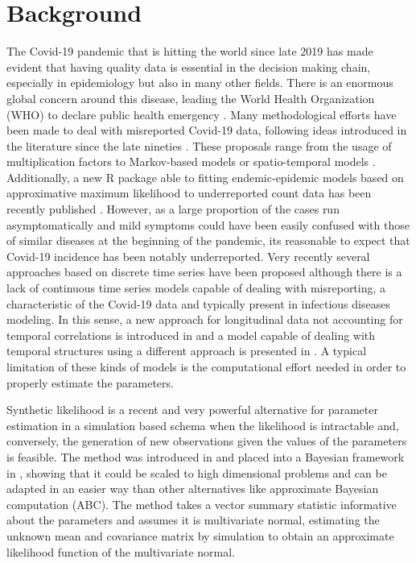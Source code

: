 \documentclass{bmcart}
\begin{document}
\section*{Background}\label{intro}
The Covid-19 pandemic that is hitting the world since late 2019 has made evident that having quality data is essential in the decision making chain, especially in epidemiology but also in many other fields. There is an enormous global concern around this disease, leading the World Health Organization (WHO) to declare public health emergency \cite{Sohrabi2020}. Many methodological efforts have been made to deal with misreported Covid-19 data, following ideas introduced in the literature since the late nineties \cite{Bernard2014,Arendt2013,Rosenman2006,Alfonso2015,Winkelmann1996,Gibbons2014}. These proposals range from the usage of multiplication factors \cite{Stocks2018} to Markov-based models \cite{Azmon2014,Magal2018} or spatio-temporal models \cite{Stoner2019}. Additionally, a new R \cite{RCoreTeam2019} package able to fitting endemic-epidemic models based on approximative maximum likelihood to underreported count data has been recently published \cite{JohannesBracher2019}. However, as a large proportion of the cases run asymptomatically \cite{Oran2020} and mild symptoms could have been easily confused with those of similar diseases at the beginning of the pandemic, its reasonable to expect that Covid-19 incidence has been notably underreported. Very recently several approaches based on discrete time series have been proposed \cite{Fernandez-Fontelo2016,FernandezFontelo2019,Fernandez-Fontelo2020} although there is a lack of continuous time series models capable of dealing with misreporting, a characteristic of the Covid-19 data and typically present in infectious diseases modeling. In this sense, a new approach for longitudinal data not accounting for temporal correlations is introduced in \cite{Morina2021} and a model capable of dealing with temporal structures using a different approach is presented in \cite{Morina2020}. A typical limitation of these kinds of models is the computational effort needed in order to properly estimate the parameters.

Synthetic likelihood is a recent and very powerful alternative for parameter estimation in a simulation based schema when the likelihood is intractable and, conversely, the generation of new observations given the values of the parameters is feasible. The method was introduced in \cite{Wood2010} and placed into a Bayesian framework in \cite{Price2018}, showing that it could be scaled to high dimensional problems and can be adapted in an easier way than other alternatives like approximate Bayesian computation (ABC). The method takes a vector summary statistic informative about the parameters and assumes it is multivariate normal, estimating the unknown mean and covariance matrix by simulation to obtain an approximate likelihood function of the multivariate normal. 
\end{document}
